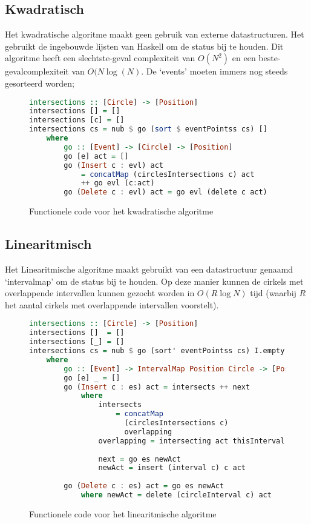 \subsection{Kwadratisch}
Het kwadratische algoritme maakt geen gebruik van externe datastructuren. Het gebruikt de ingebouwde lijsten van Haskell om de status bij te houden. Dit algoritme heeft een slechtste-geval complexiteit van $O(N^2)$ en een beste-gevalcomplexiteit van $O(N\log(N)$. De `events' moeten immers nog steeds gesorteerd worden;

\begin{figure}[H]
\begin{lstlisting}[language=haskell]
intersections :: [Circle] -> [Position]
intersections [] = []
intersections [c] = []
intersections cs = nub $ go (sort $ eventPointss cs) []
    where
        go :: [Event] -> [Circle] -> [Position]
        go [e] act = []
        go (Insert c : evl) act 
        	= concatMap (circlesIntersections c) act 
        	++ go evl (c:act)
        go (Delete c : evl) act = go evl (delete c act)
\end{lstlisting}
\label{imp:quadratic}
\caption{Functionele code voor het kwadratische algoritme}
\end{figure}

\newpage
\subsection{Linearitmisch}
Het Linearitmische algoritme maakt gebruikt van een datastructuur genaamd `intervalmap' om de status bij te houden.
Op deze manier kunnen de cirkels met overlappende intervallen kunnen gezocht worden in $O(R\log N)$ tijd (waarbij $R$ het aantal cirkels met overlappende intervallen voorstelt).

\begin{figure}[H]
\begin{lstlisting}[language=haskell]
intersections :: [Circle] -> [Position]
intersections []  = []
intersections [_] = []
intersections cs = nub $ go (sort' eventPointss cs) I.empty
    where
        go :: [Event] -> IntervalMap Position Circle -> [Position]
        go [e] _ = []
        go (Insert c : es) act = intersects ++ next
            where
                intersects 
                	= concatMap 
                	  (circlesIntersections c) 
                	  overlapping
                overlapping = intersecting act thisInterval
                
                next = go es newAct
                newAct = insert (interval c) c act
              
        go (Delete c : es) act = go es newAct
            where newAct = delete (circleInterval c) act
\end{lstlisting}
\label{imp:linearithmic}
\caption{Functionele code voor het linearitmische algoritme}
\end{figure}